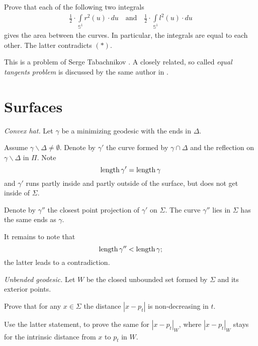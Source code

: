 Prove that
each of the following two integrals 
\begin{align*}
\tfrac12\cdot\int\limits_{\mathbb{S}^1}r^2(u)\cdot du
\quad\text{and}\quad
\tfrac12\cdot\int\limits_{\mathbb{S}^1}l^2(u)\cdot du
\end{align*}
gives 
the area between the curves.
In particular, 
the integrals are equal to each other. 
The latter contradicts $({*})$.



 This is a problem of Serge Tabachnikov \cite[see][]{tabachnikob-mi}.
A closely related, so called \emph{equal tangents problem} is discussed by the same author in \cite{tabachnikov-tan}.


\section*{Surfaces}

\textit{Convex hat.}
Let $\gamma$ be a minimizing geodesic with the ends in $\Delta$.

Assume $\gamma\backslash\Delta\ne\emptyset$.
Denote by $\gamma'$ the curve formed by $\gamma\cap \Delta$ 
and the reflection on $\gamma\backslash\Delta$ in $\Pi$.
Note 
\[\operatorname{\rm length}\gamma'=\operatorname{\rm length}\gamma\]
and $\gamma'$ runs partly inside and partly outside of the surface, but does not get inside of $\Sigma$.

Denote by $\gamma''$ the closest point projection of $\gamma'$ on $\Sigma$.
The curve $\gamma''$ lies in $\Sigma$ has the same ends as $\gamma$.

It remains to note that 
\[\operatorname{\rm length}\gamma''<\operatorname{\rm length}\gamma;\]
the latter leads to a contradiction.

 



\textit{Unbended geodesic.}
Let $W$ be the closed unbounded set formed by $\Sigma$ and its exterior points.

Prove that for any $x\in\Sigma$ the distance $|x - p_t|$ is non-decreasing in $t$.

Use the latter statement, to prove the same for $|x - p_t|_W$,
where $|x - p_t|_W$ stays for the intrinsic distance from $x$ to $p_t$ in $W$.

